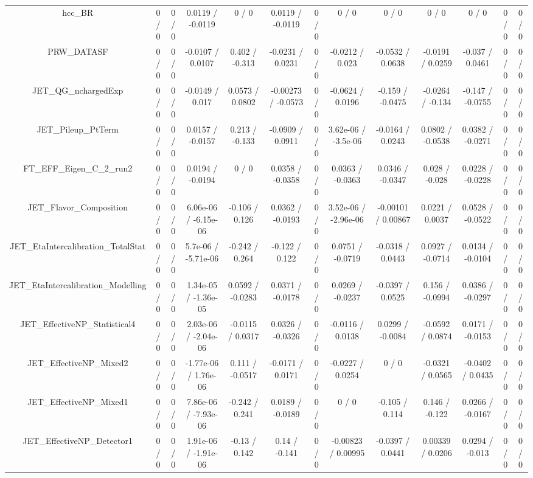 \documentclass[10pt]{article}
\begin{document}
\begin{table}[htbp]
\begin{center}
\begin{tabular}{|c|c|c|c|c|c|c|c|c|c|c|c|c|}
  hcc_BR & 0 / 0 & 0 / 0 & 0.0119 / -0.0119 & 0 / 0 & 0.0119 / -0.0119 & 0 / 0 & 0 / 0 & 0 / 0 & 0 / 0 & 0 / 0 & 0 / 0 & 0 / 0 \\ 
  PRW_DATASF & 0 / 0 & 0 / 0 & -0.0107 / 0.0107 & 0.402 / -0.313 & -0.0231 / 0.0231 & 0 / 0 & -0.0212 / 0.023 & -0.0532 / 0.0638 & -0.0191 / 0.0259 & -0.037 / 0.0461 & 0 / 0 & 0 / 0 \\ 
  JET_QG_nchargedExp & 0 / 0 & 0 / 0 & -0.0149 / 0.017 & 0.0573 / 0.0802 & -0.00273 / -0.0573 & 0 / 0 & -0.0624 / 0.0196 & -0.159 / -0.0475 & -0.0264 / -0.134 & -0.147 / -0.0755 & 0 / 0 & 0 / 0 \\ 
  JET_Pileup_PtTerm & 0 / 0 & 0 / 0 & 0.0157 / -0.0157 & 0.213 / -0.133 & -0.0909 / 0.0911 & 0 / 0 & 3.62e-06 / -3.5e-06 & -0.0164 / 0.0243 & 0.0802 / -0.0538 & 0.0382 / -0.0271 & 0 / 0 & 0 / 0 \\ 
  FT_EFF_Eigen_C_2_run2 & 0 / 0 & 0 / 0 & 0.0194 / -0.0194 & 0 / 0 & 0.0358 / -0.0358 & 0 / 0 & 0.0363 / -0.0363 & 0.0346 / -0.0347 & 0.028 / -0.028 & 0.0228 / -0.0228 & 0 / 0 & 0 / 0 \\ 
  JET_Flavor_Composition & 0 / 0 & 0 / 0 & 6.06e-06 / -6.15e-06 & -0.106 / 0.126 & 0.0362 / -0.0193 & 0 / 0 & 3.52e-06 / -2.96e-06 & -0.00101 / 0.00867 & 0.0221 / 0.0037 & 0.0528 / -0.0522 & 0 / 0 & 0 / 0 \\ 
  JET_EtaIntercalibration_TotalStat & 0 / 0 & 0 / 0 & 5.7e-06 / -5.71e-06 & -0.242 / 0.264 & -0.122 / 0.122 & 0 / 0 & 0.0751 / -0.0719 & -0.0318 / 0.0443 & 0.0927 / -0.0714 & 0.0134 / -0.0104 & 0 / 0 & 0 / 0 \\ 
  JET_EtaIntercalibration_Modelling & 0 / 0 & 0 / 0 & 1.34e-05 / -1.36e-05 & 0.0592 / -0.0283 & 0.0371 / -0.0178 & 0 / 0 & 0.0269 / -0.0237 & -0.0397 / 0.0525 & 0.156 / -0.0994 & 0.0386 / -0.0297 & 0 / 0 & 0 / 0 \\ 
  JET_EffectiveNP_Statistical4 & 0 / 0 & 0 / 0 & 2.03e-06 / -2.04e-06 & -0.0115 / 0.0317 & 0.0326 / -0.0326 & 0 / 0 & -0.0116 / 0.0138 & 0.0299 / -0.0084 & -0.0592 / 0.0874 & 0.0171 / -0.0153 & 0 / 0 & 0 / 0 \\ 
  JET_EffectiveNP_Mixed2 & 0 / 0 & 0 / 0 & -1.77e-06 / 1.76e-06 & 0.111 / -0.0517 & -0.0171 / 0.0171 & 0 / 0 & -0.0227 / 0.0254 & 0 / 0 & -0.0321 / 0.0565 & -0.0402 / 0.0435 & 0 / 0 & 0 / 0 \\ 
  JET_EffectiveNP_Mixed1 & 0 / 0 & 0 / 0 & 7.86e-06 / -7.93e-06 & -0.242 / 0.241 & 0.0189 / -0.0189 & 0 / 0 & 0 / 0 & -0.105 / 0.114 & 0.146 / -0.122 & 0.0266 / -0.0167 & 0 / 0 & 0 / 0 \\ 
  JET_EffectiveNP_Detector1 & 0 / 0 & 0 / 0 & 1.91e-06 / -1.91e-06 & -0.13 / 0.142 & 0.14 / -0.141 & 0 / 0 & -0.00823 / 0.00995 & -0.0397 / 0.0441 & 0.00339 / 0.0206 & 0.0294 / -0.013 & 0 / 0 & 0 / 0 \\ 

\end{tabular}
\end{center}
\end{table}
\end{document}
